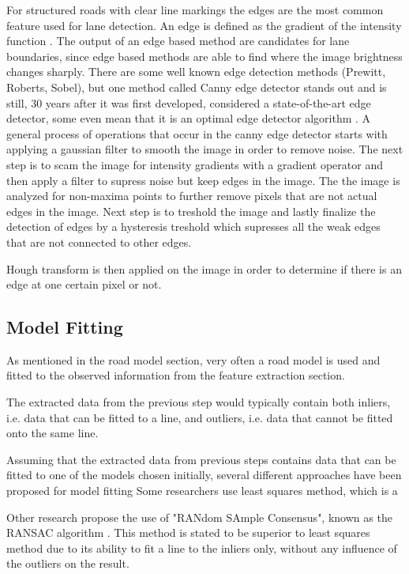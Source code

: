For structured roads with clear line markings the edges are the most common feature used for lane detection. An edge is defined as the gradient of the intensity function \cite{Yenikaya:2013:KVR:2522968.2522970}. The output of an edge based method are candidates for lane boundaries, since edge based methods are able to find where the image brightness changes sharply. There are some well known edge detection methods (Prewitt, Roberts, Sobel), but one method called Canny edge detector stands out and is still, 30 years after it was first developed, considered a state-of-the-art edge detector, some even mean that it is an optimal edge detector algorithm \cite{bhadauria2013comparison}. A general process of operations that occur in the canny edge detector starts with applying a gaussian filter to smooth the image in order to remove noise. The next step is to scam the image for intensity gradients with a gradient operator and then apply a filter to supress noise but keep edges in the image. The the image is analyzed for non-maxima points to further remove pixels that are not actual edges in the image. Next step is to treshold the image and lastly finalize the detection of edges by a hysteresis treshold which supresses all the weak edges that are not connected to other edges. 

Hough transform is then applied on the image in order to determine if there is an edge at one certain pixel or not. 


\subsection{Model Fitting}
As mentioned in the road model section, very often a road model is used and fitted to the observed information from the feature extraction section. 

The extracted data from the previous step would typically contain both inliers, i.e. data that can be fitted to a line, and outliers, i.e. data that cannot be fitted onto the same line. \cite{raguram2008comparative}

Assuming that the extracted data from previous steps contains data that can be fitted to one of the models chosen initially, several different approaches have been proposed for model fitting \cite{BarHillel2014} 
Some researchers use least squares method, which is a 

Other research propose the use of "RANdom SAmple Consensus", known as the RANSAC algorithm \cite{huang2009finding}\cite{aly2008real} \cite{li2013lane}. This method is stated to be superior to least squares method due to its ability to fit a line to the inliers only, without any influence of the outliers on the result.  


